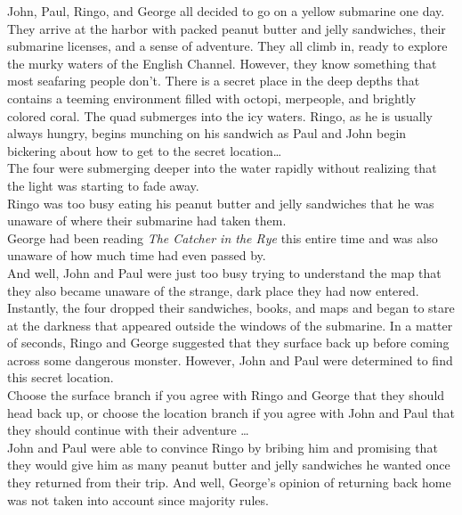 \documentclass{article}
\begin{document}
John, Paul, Ringo, and George all decided to go on a yellow submarine one day.
They arrive at the harbor with packed peanut butter and jelly sandwiches,
their submarine licenses, and a sense of adventure.
They all climb in, ready to explore the murky waters of the English Channel.
However, they know something that most seafaring people don’t.
There is a secret place in the deep depths that contains a teeming environment
filled with octopi, merpeople, and brightly colored coral.
The quad submerges into the icy waters. Ringo, as he is usually always hungry,
begins munching on his sandwich as Paul and John begin bickering about how to
get to the secret location… \\

The four were submerging deeper into the water rapidly without realizing that
the light was starting to fade away.\\

Ringo was too busy eating his peanut butter and jelly sandwiches that he was
unaware of where their submarine had taken them.\\

George had been reading \textit{The Catcher in the Rye} this entire time and was
also unaware of how much time had even passed by.\\

And well, John and Paul were just too busy trying to understand the map that they
also became unaware of the strange, dark place they had now entered. \\

Instantly, the four dropped their sandwiches, books, and maps and began to stare
at the darkness that appeared outside the windows of the submarine. In a matter
of seconds, Ringo and George suggested that they surface back up before coming
across some dangerous monster. However, John and Paul were determined to find this
secret location.\\

Choose the surface branch if you agree with Ringo and George that they should
head back up, or choose the location branch if you agree with John and Paul that
they should continue with their adventure …\\

John and Paul were able to convince Ringo by bribing him and promising that they
would give him as many peanut butter and jelly sandwiches he wanted once they
returned from their trip. And well, George’s opinion of returning back home was
not taken into account since majority rules. \\
\end{document}
